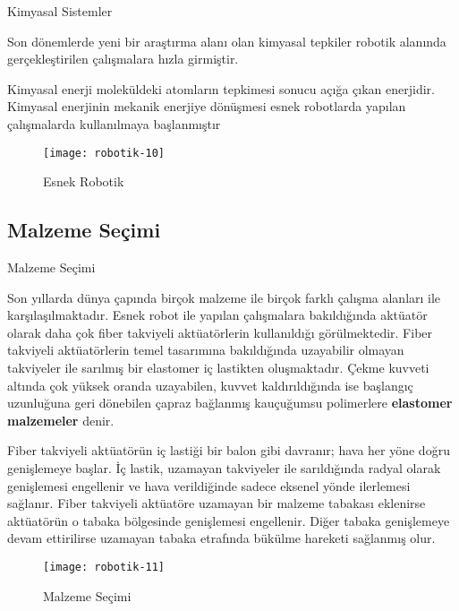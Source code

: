 \documentclass{beamer}
\begin{document}
\begin{frame}
\begin{block}{Kimyasal Sistemler}
\item Son dönemlerde yeni bir araştırma alanı olan kimyasal tepkiler robotik alanında gerçekleştirilen çalışmalara hızla girmiştir.
\item Kimyasal enerji moleküldeki atomların tepkimesi sonucu açığa çıkan enerjidir. Kimyasal enerjinin mekanik enerjiye dönüşmesi esnek robotlarda yapılan çalışmalarda kullanılmaya başlanmıştır 
\end{block}
\begin{figure}
\texttt{[image: robotik-10]}
\caption{\label{Şekil-11} Esnek Robotik}
\end{figure}
\end{frame}

\subsection{Malzeme Seçimi}

\begin{frame}{Malzeme Seçimi}
\begin{block}
\item Son yıllarda dünya çapında birçok malzeme ile birçok farklı çalışma alanları ile karşılaşılmaktadır. Esnek robot ile yapılan çalışmalara bakıldığında aktüatör olarak daha çok fiber takviyeli aktüatörlerin kullanıldığı
görülmektedir. Fiber takviyeli aktüatörlerin temel tasarımına bakıldığında uzayabilir olmayan takviyeler ile sarılmış bir elastomer iç lastikten oluşmaktadır. Çekme kuvveti altında çok yüksek oranda uzayabilen, kuvvet kaldırıldığında ise başlangıç uzunluğuna geri dönebilen çapraz bağlanmış kauçuğumsu polimerlere 
\textbf{elastomer malzemeler} denir.
\end{block}
\end{frame}

\begin{frame}
\begin{block}
\item Fiber takviyeli aktüatörün iç lastiği bir balon gibi davranır; hava her yöne doğru genişlemeye başlar. İç lastik, uzamayan takviyeler ile sarıldığında radyal olarak genişlemesi engellenir ve hava verildiğinde sadece eksenel yönde ilerlemesi sağlanır.
Fiber takviyeli aktüatöre uzamayan bir malzeme tabakası eklenirse aktüatörün o tabaka bölgesinde genişlemesi engellenir. Diğer tabaka genişlemeye devam ettirilirse uzamayan tabaka etrafında bükülme hareketi sağlanmış olur.
\end{block}
\begin{figure}
\texttt{[image: robotik-11]}
\caption{\label{Şekil-12} Malzeme Seçimi}
\end{figure}
\end{frame}
\end{document}
